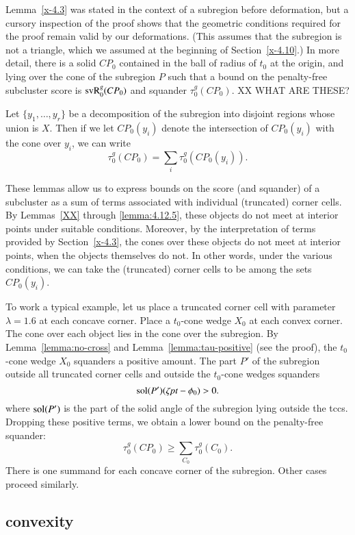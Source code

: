 Lemma~\ref{x-4.3} was stated in the context of a subregion before
deformation, but a cursory inspection of the proof shows that the
geometric conditions required for the proof remain valid by our
deformations. (This assumes that the subregion is not a triangle, which
we assumed at the beginning of Section~\ref{x-4.10}.) In more detail,
there is a solid $CP_0$ contained in the ball of radius of $t_0$ at the
origin, and lying over the cone of the subregion $P$ such that a bound
on the penalty-free subcluster score is 
${\operatorname{svR}}^g_0(CP_0)$ and squander $\tau^g_0(CP_0)$. 
XX WHAT ARE THESE?


Let $\{y_1,\ldots,y_r\}$ be a decomposition of the subregion into
disjoint regions whose union is $X$. Then if we let $CP_0(y_i)$ denote
the intersection of $CP_0(y_i)$ with the cone over $y_i$, we can write
    $$\tau^g_0(CP_0) =\sum_i \tau^g_0(CP_0(y_i)).$$

These lemmas allow us to express bounds on the score (and
squander) of a subcluster as a sum of terms associated with
individual (truncated) corner cells. By Lemmas~\ref{XX} %
through \ref{lemma:4.12.5}, these objects do not meet at interior
points under suitable conditions. Moreover, by the interpretation
of terms provided by Section~\ref{x-4.3}, the cones over these
objects do not meet at interior points, when the objects
themselves do not. In other words, under the various conditions,
we can take the (truncated) corner cells to be among the sets
$CP_0(y_i)$.

To work a typical example, let us place a truncated corner cell with
parameter $\lambda=1.6$ at each concave corner.  Place a $t_0$-cone
wedge $X_0$ at each convex corner. The cone over each object lies in the
cone over the subregion. By Lemma~\ref{lemma:no-cross} and
Lemma~\ref{lemma:tau-positive} (see the proof), the $t_0$-cone wedge
$X_0$ squanders a positive amount.  The part $P'$ of the subregion
outside all truncated corner cells and outside the $t_0$-cone wedges
squanders
    $$\operatorname{sol}(P')(\zeta\hbox{\it pt}-\phi_0) > 0.$$
where $\operatorname{sol}(P')$ is the part of the solid angle of the subregion
lying outside the tccs. Dropping these positive terms, we obtain a
lower bound on the penalty-free squander:
    $$\tau^g_0(CP_0) \ge \sum_{C_0} \tau^g_0(C_0).$$
There is one summand for each concave corner of the subregion.
Other cases proceed similarly.


\subsection{convexity} %

